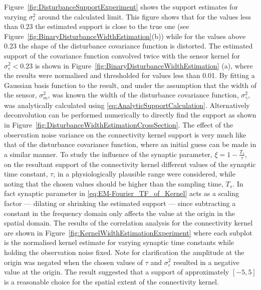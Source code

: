\documentclass[]{article}
\begin{document}
Figure~\ref{fig:DisturbanceSupportExperiment} shows the support estimates for varying  $\sigma^2_{\varepsilon}$ around the calculated limit. This figure shows that for the values less than 0.23 the estimated support is close to the true one (see Figure~\ref{fig:BinaryDisturbanceWidthEstimation}(b)) while for the values above 0.23 the shape of the disturbance covariance function is distorted. The estimated support of the covariance function convolved twice with the sensor kernel for  $\sigma^2_{\varepsilon}<$0.23 is shown in Figure~\ref{fig:BinaryDisturbanceWidthEstimation} (a), where the results were normalised and thresholded for values less than 0.01. By fitting a Gaussian basis function to the result, and under the assumption that the width of the sensor, $\sigma_m^2$, was known the width of the disturbance covariance function, $\sigma_{\gamma}^2$, was analytically calculated  using \eqref{eq:AnalyticSupportCalculation}. Alternatively deconvolution can be performed numerically to directly find the support as shown in Figure~\ref{fig:DisturbanceWidthEstimationCrossSection}. The effect of the observation noise variance on the connectivity kernel support is very much like that of the disturbance covariance function, where an initial guess can be made in a similar manner. To study the influence of the synaptic parameter, $\xi=1-\frac{ T_s}{\tau}$, on the resultant support of the connectivity kernel different values of the synaptic time constant, $\tau$, in a physiologically plausible range were considered, while noting that the chosen values should be higher than the sampling time, $T_s$. In fact synaptic parameter in \eqref{eq:EM-Fourier_TF_of_Kernel}  acts as a scaling factor --- dilating or shrinking the estimated support --- since subtracting a constant in the frequency domain only affects the value at the origin in the spatial domain. The results of the correlation analysis for the connectivity kernel are shown in Figure~\ref{fig:KernelWidthEstimationExperiment} where each subplot is the normalised kernel estimate for varying synaptic time constants while holding the observation noise fixed. Note for clarification the amplitude at the origin was negated when the chosen values of $\tau$ and $\sigma^2_{\varepsilon}$ resulted in a negative value at the origin.  The result suggested that a support of approximately $\left[-5,5 \right] $ is a reasonable choice for the spatial extent of the connectivity kernel. 
\end{document}
